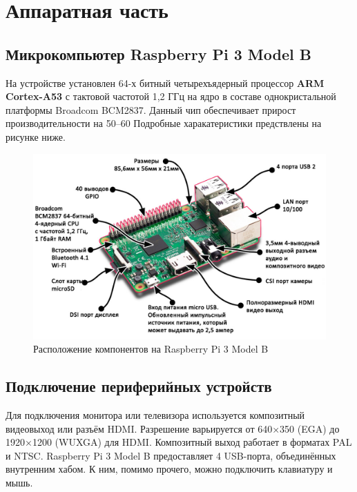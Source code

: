 \documentclass[a4paper,11pt]{article}
\begin{document}
\section{Аппаратная часть}
\subsection{Микрокомпьютер Raspberry Pi 3 Model B}
На устройстве установлен 64-х битный четырехъядерный процессор \textbf{ARM Cortex-A53} с тактовой частотой 1,2 ГГц на ядро в составе однокристальной платформы Broadcom BCM2837. Данный чип обеспечивает прирост производительности на 50–60%
Подробные харакатеристики предствлены на рисунке ниже.
\begin{center}
  \begin{figure}[h]
    \includegraphics[scale=0.4]{images/pic_2.jpeg}
    \caption{Расположение компонентов на Raspberry Pi 3 Model B}
  \end{figure}
\end{center}

\subsection{Подключение периферийных устройств}
\noindent Для подключения монитора или телевизора используется композитный видеовыход или разъём HDMI. Разрешение варьируется от 640×350 (EGA) до 1920×1200 (WUXGA) для HDMI. Композитный выход работает в форматах PAL и NTSC. Raspberry Pi 3 Model B предоставляет 4 USB-порта, объединённых внутренним хабом. К ним, помимо прочего, можно подключить клавиатуру и мышь. \\
\end{document}
